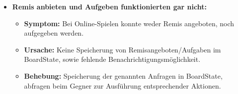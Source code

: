 \documentclass[parskip=full]{scrartcl}
\begin{document}
\begin{itemize}
\item{\textbf{Remis anbieten und Aufgeben funktionierten gar nicht:}}
\begin{itemize}
	\item{\textbf{Symptom:}} Bei Online-Spielen konnte weder Remis angeboten, noch aufgegeben werden.
	\item{\textbf{Ursache:}} Keine Speicherung von Remisangeboten/Aufgaben im BoardState, sowie fehlende Benachrichtigungsmöglichkeit.
	\item{\textbf{Behebung:}} Speicherung der genannten Anfragen in BoardState, abfragen beim Gegner zur Ausführung entsprechender Aktionen.
\end{itemize}

\end{itemize}
\end{document}
